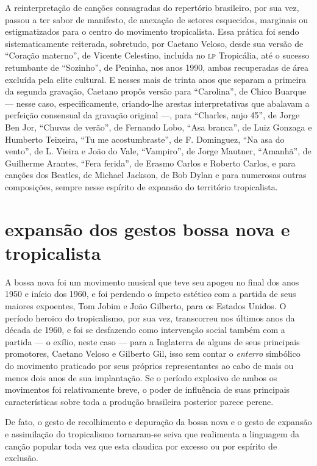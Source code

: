 A reinterpretação de canções consagradas do repertório brasileiro, por
sua vez, passou a ter sabor de manifesto, de anexação de setores
esquecidos, marginais ou estigmatizados para o centro do movimento
tropicalista. Essa prática foi sendo sistematicamente reiterada,
sobretudo, por Caetano Veloso, desde sua versão de ``Coração materno'', de Vicente Celestino, incluída no \textsc{lp} Tropicália, até o sucesso retumbante
de ``Sozinho'', de Peninha, nos anos 1990, ambas recuperadas de área
excluída pela elite cultural. E nesses mais de trinta anos que separam a
primeira da segunda gravação, Caetano propôs versão para ``Carolina'', de Chico Buarque --- nesse caso, especificamente, criando-lhe arestas
interpretativas que abalavam a perfeição consensual da gravação original
---, para ``Charles, anjo 45'', de Jorge Ben Jor, ``Chuvas de verão'', de Fernando Lobo, ``Asa branca'', de Luiz Gonzaga e Humberto Teixeira, ``Tu
me acostumbraste'', de  F. Dominguez, ``Na asa do vento'', de L. Vieira e João
do Vale, ``Vampiro'', de Jorge Mautner, ``Amanhã'', de Guilherme Arantes,
``Fera ferida'', de Erasmo Carlos e Roberto Carlos, e para canções dos
Beatles, de Michael Jackson, de Bob Dylan e para numerosas outras
composições, sempre nesse espírito de expansão do território
tropicalista.

\section{expansão dos gestos bossa nova e tropicalista}

A bossa nova foi um movimento musical que teve seu apogeu no final dos
anos 1950 e início dos 1960, e foi perdendo o ímpeto estético com a
partida de seus maiores expoentes, Tom Jobim e João Gilberto, para os
Estados Unidos. O período heroico do tropicalismo, por sua vez,
transcorreu nos últimos anos da década de 1960, e foi se desfazendo como
intervenção social também com a partida --- o exílio, neste caso --- para a
Inglaterra de alguns de seus principais promotores, Caetano Veloso e
Gilberto Gil, isso sem contar o \textit{enterro} simbólico do movimento
praticado por seus próprios representantes ao cabo de mais ou menos dois
anos de sua implantação. Se o período explosivo de ambos os movimentos
foi relativamente breve, o poder de influência de suas principais
características sobre toda a produção brasileira posterior parece
perene.

De fato, o gesto de recolhimento e depuração da bossa nova e o gesto de
expansão e assimilação do tropicalismo tornaram-se seiva que realimenta
a linguagem da canção popular toda vez que esta claudica por excesso ou
por espírito de exclusão.

